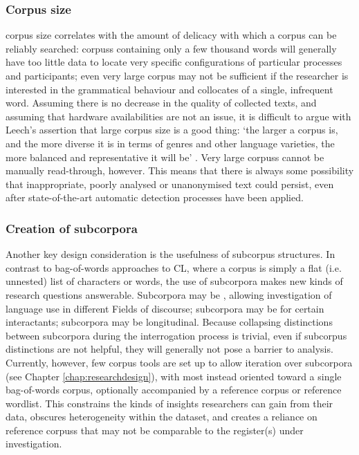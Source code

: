 \subsubsection*{Corpus size}

\Gls{corpus} size correlates with the amount of delicacy with which a corpus can be reliably searched: \glspl{corpus} containing only a few thousand words will generally have too little data to locate very specific configurations of particular processes and participants; even very large \gls{corpus} may not be sufficient if the researcher is interested in the grammatical behaviour and collocates of a single, infrequent word. Assuming there is no decrease in the quality of collected texts, and assuming that hardware availabilities are not an issue, it is difficult to argue with Leech's assertion that large \gls{corpus} size is a good thing: `the larger a \gls{corpus} is, and the more diverse it is in terms of genres and other language varieties, the more balanced and representative it will be' \parencite*[p.~6]{leech_new_2006}. Very large \glspl{corpus} cannot be manually read-through, however. This means that there is always some possibility that inappropriate, poorly analysed or unanonymised text could persist, even after state\hyp{}of\hyp{}the\hyp{}art automatic detection processes have been applied.

\subsubsection*{Creation of subcorpora}

Another key design consideration is the usefulness of subcorpus structures. In contrast to bag\hyp{}of\hyp{}words approaches to \gls{CL}, where a \gls{corpus} is simply a flat (i.e. unnested) list of characters or words, the use of subcorpora makes new kinds of research questions answerable. Subcorpora may be , allowing investigation of language use in different Fields of discourse; subcorpora may be for certain interactants; subcorpora may be longitudinal. Because collapsing distinctions between subcorpora during the interrogation process is trivial, even if subcorpus distinctions are not helpful, they will generally not pose a barrier to analysis. Currently, however, few corpus tools are set up to allow iteration over subcorpora (see Chapter \ref{chap:researchdesign}), with most instead oriented toward a single bag\hyp{}of\hyp{}words \gls{corpus}, optionally accompanied by a reference \gls{corpus} or reference wordlist. This constrains the kinds of insights researchers can gain from their data, obscures heterogeneity within the dataset, and creates a reliance on reference \glspl{corpus} that may not be comparable to the register(s) under investigation.

